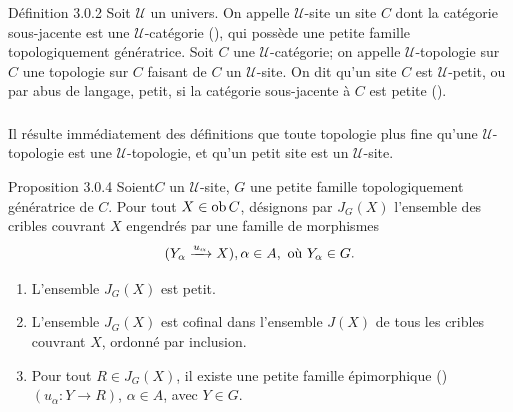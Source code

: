 \documentclass[10pt]{../fichiers-configuration-latex/smfart}
\begin{document}
\begin{enonce*}{Définition 3.0.2}
Soit $𝒰$ un univers. On appelle $𝒰$-site un site $C$
dont la catégorie sous-jacente est une $𝒰$-catégorie
{\rm()}, qui possède une petite famille
topologiquement génératrice. Soit $C$ une
$𝒰$-catégorie; on appelle $𝒰$-topologie sur $C$
une topologie sur $C$ faisant de $C$ un $𝒰$-site. On dit
qu'un site $C$ est $𝒰$-petit, ou par abus de langage, petit,
si la catégorie sous-jacente à $C$ est petite
{\rm()}.
\end{enonce*}

\setcounter{subsubsection}{2}
\subsubsection{}
Il résulte immédiatement des définitions que toute topologie
plus fine qu'une $𝒰$-topologie est une
$𝒰$-topologie, et qu'un petit site est un $𝒰$-site.

\begin{enonce*}{Proposition 3.0.4}
Soient\pageoriginale $C$ un $𝒰$-site, $G$ une petite famille
topologiquement génératrice de $C$. Pour tout $X\in \operatorname{ob} C$,
désignons par $J_G(X)$ l'ensemble des cribles couvrant $X$
engendrés par une famille de morphismes
$$
(Y_{\alpha}\xrightarrow{u_{\alpha}} X), \alpha\in A, \mbox{ où }
Y_{\alpha} \in G{}.
$$
\begin{enumerate}
\renewcommand{\labelenumi}{\theenumi)}
\item L'ensemble $J_G(X)$ est petit.

\item L'ensemble $J_G(X)$ est cofinal dans l'ensemble $J(X)$ de tous
  les cribles couvrant $X$, ordonné par inclusion.

\item Pour tout $R\in J_G(X)$, il existe une petite famille
  épimorphique {\rm()} $(u_{\alpha}:Y\rightarrow R)$, $\alpha
  \in A$, avec $Y\in G$.
\end{enumerate}
\end{enonce*}
\end{document}
